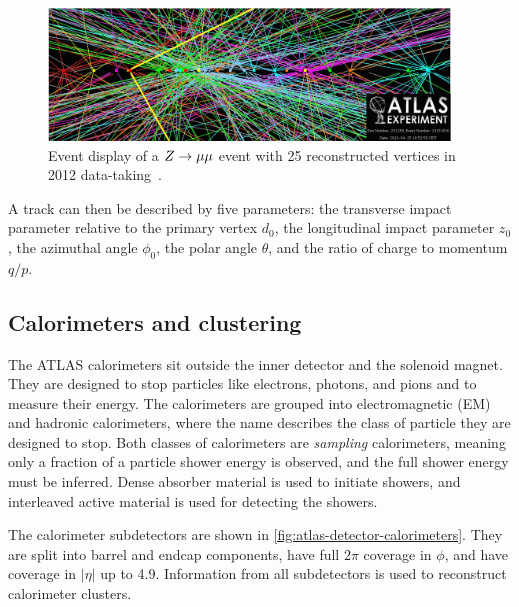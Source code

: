 \begin{figure}[tp]
  \centering
  \includegraphics[width=0.95\textwidth]{figures/lhc-atlas/2012_highPileup.png}
  \caption{Event display of a $Z \rightarrow \mu\mu$ event with 25 reconstructed vertices in 2012 data-taking~\cite{atlas-eventdisplays}.}
  \label{fig:atlas-detector-pileup}
\end{figure}

A track can then be described by five parameters: the transverse impact parameter relative to the primary vertex $d_0$, the longitudinal impact parameter $z_0$, the azimuthal angle $\phi_0$, the polar angle $\theta$, and the ratio of charge to momentum $q/p$. 

\subsection{Calorimeters and clustering}

The ATLAS calorimeters sit outside the inner detector and the solenoid magnet. They are designed to stop particles like electrons, photons, and pions and to measure their energy. The calorimeters are grouped into electromagnetic (EM) and hadronic calorimeters, where the name describes the class of particle they are designed to stop. Both classes of calorimeters are \textit{sampling} calorimeters, meaning only a fraction of a particle shower energy is observed, and the full shower energy must be inferred. Dense absorber material is used to initiate showers, and interleaved active material is used for detecting the showers.

The calorimeter subdetectors are shown in \cref{fig:atlas-detector-calorimeters}. They are split into barrel and endcap components, have full $2\pi$ coverage in $\phi$, and have coverage in $|\eta|$ up to 4.9. Information from all subdetectors is used to reconstruct calorimeter clusters.

